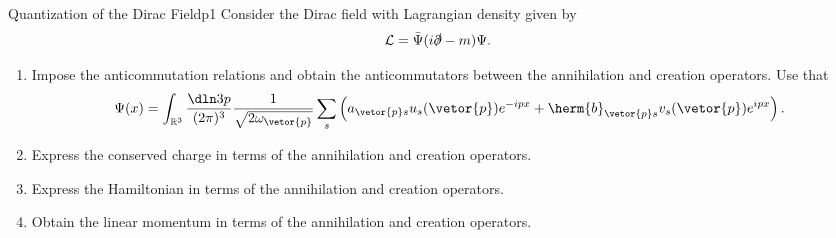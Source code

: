 \begin{problem}{Quantization of the Dirac Field}{p1}
    Consider the Dirac field with Lagrangian density given by
    \begin{equation*}
    \mathcal{L} = \bar{\Psi} (i \slashed{\partial} - m) \Psi.
    \end{equation*}
    \begin{enumerate}[label=(\alph*)]
        \item Impose the anticommutation relations and obtain the anticommutators between the annihilation and creation operators. Use that
           \begin{equation*}
              \Psi(x) = \int_{\mathbb{R}^3} \frac{\dln3p}{(2\pi)^3} \frac{1}{\sqrt{2 \omega_{\vetor{p}}}} \sum_s \left(a_{\vetor{p}s} u_{s}(\vetor{p}) e^{-ipx} + \herm{b}_{\vetor{p}s}v_{s}(\vetor{p}) e^{ipx}\right).
           \end{equation*}
        \item Express the conserved charge in terms of the annihilation and creation operators.
        \item Express the Hamiltonian in terms of the annihilation and creation operators.
        \item Obtain the linear momentum in terms of the annihilation and creation operators.
    \end{enumerate}
\end{problem}
